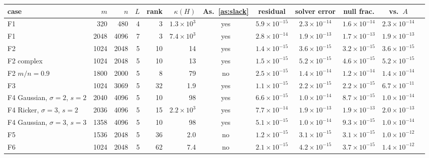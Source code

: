 \begin{tabular}{@{}lrrrrrcccccc@{}}
\toprule
case & $m$ & $n$ & $L$ & rank & $\kappa(H)$ & As.~\ref{as:slack} & residual & solver error & null frac. & vs.\ $A$\\
\midrule
F1 & 320 & 480 & 4 & 3 & $1.3{\times}10^{3}$ & yes & $5.9{\times}10^{-15}$ & $2.3{\times}10^{-14}$ & $1.6{\times}10^{-14}$ & $2.3{\times}10^{-14}$\\
F1 & 2048 & 4096 & 7 & 3 & $7.4{\times}10^{3}$ & yes & $2.8{\times}10^{-14}$ & $1.9{\times}10^{-13}$ & $1.7{\times}10^{-13}$ & $1.9{\times}10^{-13}$\\
F2 & 1024 & 2048 & 5 & 10 & 14 & yes & $1.4{\times}10^{-15}$ & $3.6{\times}10^{-15}$ & $3.2{\times}10^{-15}$ & $3.6{\times}10^{-15}$\\
F2 complex & 1024 & 2048 & 5 & 10 & 13 & yes & $1.5{\times}10^{-15}$ & $5.2{\times}10^{-15}$ & $4.6{\times}10^{-15}$ & $5.2{\times}10^{-15}$\\
F2 $m/n=0.9$ & 1800 & 2000 & 5 & 8 & 79 & no & $2.5{\times}10^{-15}$ & $1.4{\times}10^{-14}$ & $1.2{\times}10^{-14}$ & $1.4{\times}10^{-14}$\\
F3 & 1024 & 3069 & 5 & 32 & 1.9 & yes & $1.1{\times}10^{-15}$ & $2.2{\times}10^{-15}$ & $2.2{\times}10^{-15}$ & $6.7{\times}10^{-11}$\\
F4 Gaussian, $\sigma=2$, $s=2$ & 2040 & 4096 & 5 & 10 & 98 & yes & $6.6{\times}10^{-15}$ & $1.0{\times}10^{-14}$ & $8.7{\times}10^{-15}$ & $1.0{\times}10^{-14}$\\
F4 Ricker, $\sigma=3$, $s=2$ & 2036 & 4096 & 5 & 15 & $2.2{\times}10^{3}$ & yes & $7.7{\times}10^{-14}$ & $1.9{\times}10^{-13}$ & $1.9{\times}10^{-13}$ & $2.0{\times}10^{-13}$\\
F4 Gaussian, $\sigma=3$, $s=3$ & 1358 & 4096 & 5 & 10 & 98 & yes & $5.1{\times}10^{-15}$ & $1.0{\times}10^{-14}$ & $9.3{\times}10^{-15}$ & $1.0{\times}10^{-14}$\\
F5 & 1536 & 2048 & 5 & 36 & 2.0 & no & $1.2{\times}10^{-15}$ & $3.1{\times}10^{-15}$ & $3.1{\times}10^{-15}$ & $1.0{\times}10^{-12}$\\
F6 & 1024 & 2048 & 5 & 62 & 7.4 & no & $2.1{\times}10^{-15}$ & $4.2{\times}10^{-15}$ & $3.7{\times}10^{-15}$ & $1.4{\times}10^{-12}$\\
\bottomrule
\end{tabular}
